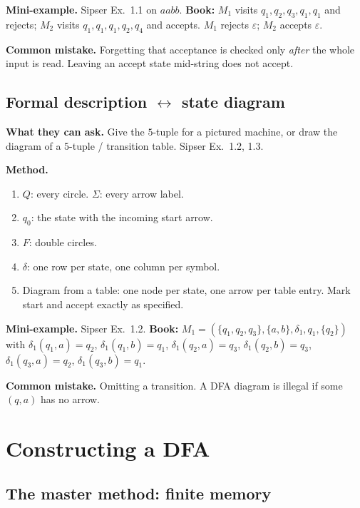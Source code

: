 \documentclass[11pt,a4paper]{article}
\newcommand{\eps}{\varepsilon}
\begin{document}
\textbf{Mini-example.}
Sipser Ex.~1.1 on $aabb$. \textbf{Book:} $M_1$ visits
$q_1,q_2,q_3,q_1,q_1$ and rejects; $M_2$ visits
$q_1,q_1,q_1,q_2,q_4$ and accepts. $M_1$ rejects $\eps$; $M_2$ accepts
$\eps$.

\textbf{Common mistake.}
Forgetting that acceptance is checked only \emph{after} the whole input is
read. Leaving an accept state mid-string does not accept.

\subsection{Formal description $\leftrightarrow$ state diagram}

\textbf{What they can ask.}
Give the $5$-tuple for a pictured machine, or draw the diagram of a
$5$-tuple / transition table. Sipser Ex.~1.2, 1.3.

\textbf{Method.}
\begin{enumerate}
  \item $Q$: every circle. $\Sigma$: every arrow label.
  \item $q_0$: the state with the incoming start arrow.
  \item $F$: double circles.
  \item $\delta$: one row per state, one column per symbol.
  \item Diagram from a table: one node per state, one arrow per table entry.
        Mark start and accept exactly as specified.
\end{enumerate}

\textbf{Mini-example.}
Sipser Ex.~1.2. \textbf{Book:}
$M_1=(\{q_1,q_2,q_3\},\{a,b\},\delta_1,q_1,\{q_2\})$ with
$\delta_1(q_1,a)=q_2$, $\delta_1(q_1,b)=q_1$, $\delta_1(q_2,a)=q_3$,
$\delta_1(q_2,b)=q_3$, $\delta_1(q_3,a)=q_2$, $\delta_1(q_3,b)=q_1$.

\textbf{Common mistake.}
Omitting a transition. A DFA diagram is illegal if some $(q,a)$ has no
arrow.

\section{Constructing a DFA}
\label{type:dfa-design}

\subsection{The master method: finite memory}
\end{document}
